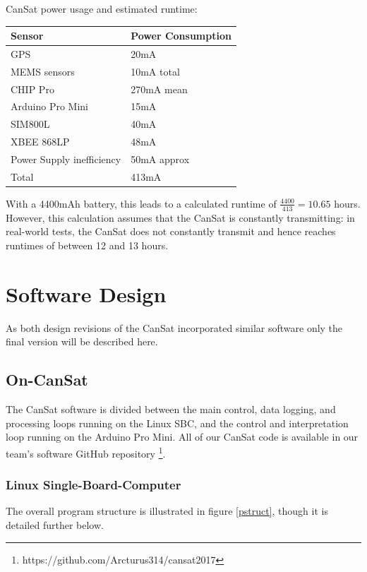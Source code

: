 \documentclass[]{report}
\begin{document}
CanSat power usage and estimated runtime:

	\begin{center}
	\begin{tabular}{ll}
		Sensor&Power Consumption\\
		\hline
		GPS&20mA \\
		MEMS sensors&10mA total \\
		CHIP Pro&270mA mean \\
		Arduino Pro Mini&15mA \\
		SIM800L&40mA \\
		XBEE 868LP&48mA \\
		Power Supply inefficiency&50mA approx\\
		\hline
		Total&413mA
	\end{tabular}	
	\end{center}	

With a 4400mAh battery, this leads to a calculated runtime of $\frac{4400}{413}=10.65$ hours. However, this calculation assumes that the CanSat is constantly transmitting: in real-world tests, the CanSat does not constantly transmit and hence reaches runtimes of between 12 and 13 hours.

\section{Software Design}
As both design revisions of the CanSat incorporated similar software only the final version will be described here.
\subsection{On-CanSat}
The CanSat software is divided between the main control, data logging, and processing loops running on the Linux SBC, and the control and interpretation loop running on the Arduino Pro Mini. All of our CanSat code is available in our team's software GitHub repository \footnote{https://github.com/Arcturus314/cansat2017}.
\subsubsection{Linux Single-Board-Computer}
The overall program structure is illustrated in figure \ref{pstruct}, though it is detailed further below.

\end{document}
